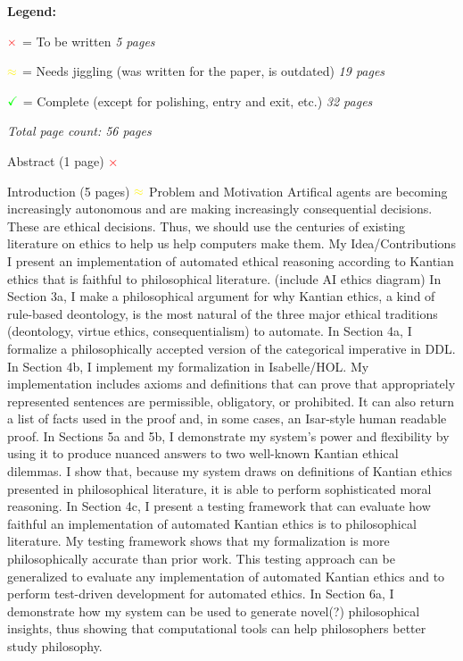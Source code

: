 \documentclass[11pt]{article}
\begin{document}
\textbf{Legend:}

$\color{red} \mathbf{\times} \color{black}$ = To be written \hfill \emph{5 pages}
 
$\color{yellow} \mathbf{\approx} \color{black}$ = Needs jiggling (was written for the paper, is outdated) \hfill \emph{19 pages}

$\color{green} \mathbf{\checkmark} \color{black}$ = Complete (except for polishing, entry and exit, etc.) \hfill \emph{32 pages}

\hfill \emph{Total page count: 56 pages}

\begin{outline}[enumerate]
\1 Abstract (1 page) \hfill $\color{red} \mathbf{\times} \color{black}$
 
\1 Introduction (5 pages) \hfill $\color{yellow} \mathbf{\approx} \color{black}$
\2 Problem and Motivation 
\3 Artifical agents are becoming increasingly autonomous and are making increasingly consequential 
decisions. These are ethical decisions. Thus, we should use the centuries of existing literature on
ethics to help us help computers make them.
\2 My Idea/Contributions 
\3 I present an implementation of automated ethical reasoning according to Kantian ethics that is 
faithful to philosophical literature. (include AI ethics diagram)
\3 In Section 3a, I make a philosophical argument for why Kantian ethics, a kind of rule-based 
deontology, is the most natural of the three major ethical traditions (deontology, virtue ethics, 
consequentialism) to automate.
\3 In Section 4a, I formalize a philosophically accepted version of 
the categorical imperative in DDL. 
\3 In Section 4b, I implement my formalization in Isabelle/HOL. My implementation 
includes axioms and definitions that can prove that appropriately represented sentences are permissible, 
obligatory, or prohibited. It can also return a list of facts used in the proof and, in some cases, 
an Isar-style human readable proof. 
\3 In Sections 5a and 5b, I demonstrate my system's power and flexibility by 
using it to produce nuanced answers to two well-known Kantian ethical dilemmas. I show that, because 
my system draws on definitions of Kantian ethics presented in philosophical literature, it is able to 
perform sophisticated moral reasoning. 
\3 In Section 4c, I present a testing framework that can evaluate how faithful an implementation 
of automated Kantian ethics is to philosophical literature. My testing framework shows that my formalization 
is more philosophically accurate than prior work. This testing approach can be generalized to evaluate any 
implementation of automated Kantian ethics and to perform test-driven development for automated ethics.
\3 In Section 6a, I demonstrate how my system can be used to generate novel(?) philosophical
insights, thus showing that computational tools can help philosophers better study philosophy.


\end{outline}
\end{document}
